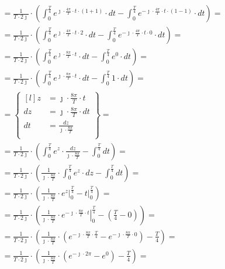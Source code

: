 \begin{task}
\begin{align*}
&=\frac{1}{T\cdot 2\jmath} \cdot \left( \int_{0}^{\frac{T}{4}}
e^{\jmath \cdot \frac{4\pi}{T} \cdot t \cdot \left(1 + 1\right)} \cdot dt - \int_{0}^{\frac{T}{4}} e^{-\jmath \cdot \frac{4\pi}{T} \cdot t \cdot \left(1-1\right)} \cdot dt \right)=\\
&=\frac{1}{T\cdot 2\jmath} \cdot \left( \int_{0}^{\frac{T}{4}}
e^{\jmath \cdot \frac{4\pi}{T} \cdot t \cdot 2} \cdot dt - \int_{0}^{\frac{T}{4}} e^{-\jmath \cdot \frac{4\pi}{T} \cdot t \cdot 0} \cdot dt \right)=\\
&=\frac{1}{T\cdot 2\jmath} \cdot \left( \int_{0}^{\frac{T}{4}} e^{\jmath \cdot \frac{8\pi}{T} \cdot t} \cdot dt - \int_{0}^{\frac{T}{4}}
e^{0} \cdot dt \right)=\\
&=\frac{1}{T\cdot 2\jmath} \cdot \left(\int_{0}^{\frac{T}{4}} e^{\jmath \cdot \frac{8\pi}{T} \cdot t} \cdot dt - \int_{0}^{\frac{T}{4}}
1 \cdot dt\right)=\\
&=\begin{Bmatrix*}[l]
z&=\jmath \cdot \frac{8\pi}{T} \cdot t\\
dz&=\jmath \cdot \frac{8\pi}{T} \cdot dt\\
dt&=\frac{dz}{\jmath \cdot \frac{8\pi}{T} }\\
\end{Bmatrix*}=\\
&=\frac{1}{T\cdot 2\jmath} \cdot \left( \int_{0}^{\frac{T}{4}} e^{z} \cdot \frac{dz}{\jmath \cdot \frac{8\pi}{T}} - \int_{0}^{\frac{T}{4}}
dt \right)=\\
&=\frac{1}{T\cdot 2\jmath} \cdot \left(\frac{1}{\jmath \cdot \frac{8\pi}{T}} \cdot \int_{0}^{\frac{T}{4}} e^{z} \cdot dz - \int_{0}^{\frac{T}{4}}
dt \right)=\\
&=\frac{1}{T\cdot 2\jmath} \cdot \left(\frac{1}{\jmath \cdot \frac{8\pi}{T}} \cdot \left. e^{z} \right|_{0}^{\frac{T}{4}} - \left. t \right|_{0}^{\frac{T}{4}} \right)=\\
&=\frac{1}{T\cdot 2\jmath} \cdot \left(\frac{1}{\jmath \cdot \frac{8\pi}{T}} \cdot \left. e^{-\jmath \cdot \frac{8\pi}{T} \cdot t} \right|_{0}^{\frac{T}{4}} - \left( \frac{T}{4}- 0 \right) \right)=\\
&=\frac{1}{T\cdot 2\jmath} \cdot \left( \frac{1}{\jmath \cdot \frac{8\pi}{T}} \cdot \left( e^{-\jmath \cdot \frac{8\pi}{T} \cdot \frac{T}{4}} - e^{-\jmath \cdot \frac{8\pi}{T} \cdot 0}\right) - \frac{T}{4} \right)=\\
&=\frac{1}{T\cdot 2\jmath} \cdot \left( \frac{1}{\jmath \cdot \frac{8\pi}{T}} \cdot \left( e^{-\jmath \cdot 2\pi} - e^{0}\right) - \frac{T}{4}\right)=\\

\end{align*}
\end{task}
